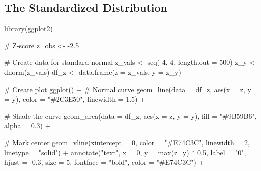 \documentclass[
  letterpaper,
  DIV=11,
  numbers=noendperiod]{scrreprt}
\newenvironment{Shaded}{\begin{snugshade}}{\end{snugshade}}
\newcommand{\AttributeTok}[1]{\textcolor[rgb]{0.40,0.45,0.13}{#1}}
\newcommand{\CommentTok}[1]{\textcolor[rgb]{0.37,0.37,0.37}{#1}}
\newcommand{\DecValTok}[1]{\textcolor[rgb]{0.68,0.00,0.00}{#1}}
\newcommand{\FloatTok}[1]{\textcolor[rgb]{0.68,0.00,0.00}{#1}}
\newcommand{\FunctionTok}[1]{\textcolor[rgb]{0.28,0.35,0.67}{#1}}
\newcommand{\NormalTok}[1]{\textcolor[rgb]{0.00,0.23,0.31}{#1}}
\newcommand{\OtherTok}[1]{\textcolor[rgb]{0.00,0.23,0.31}{#1}}
\newcommand{\SpecialCharTok}[1]{\textcolor[rgb]{0.37,0.37,0.37}{#1}}
\newcommand{\StringTok}[1]{\textcolor[rgb]{0.13,0.47,0.30}{#1}}
\begin{document}
\subsection{The Standardized
Distribution}\label{the-standardized-distribution}

\begin{Shaded}
\begin{Highlighting}[]
\FunctionTok{library}\NormalTok{(ggplot2)}

\CommentTok{\# Z{-}score}
\NormalTok{z\_obs }\OtherTok{\textless{}{-}} \SpecialCharTok{{-}}\FloatTok{2.5}

\CommentTok{\# Create data for standard normal}
\NormalTok{z\_vals }\OtherTok{\textless{}{-}} \FunctionTok{seq}\NormalTok{(}\SpecialCharTok{{-}}\DecValTok{4}\NormalTok{, }\DecValTok{4}\NormalTok{, }\AttributeTok{length.out =} \DecValTok{500}\NormalTok{)}
\NormalTok{z\_y }\OtherTok{\textless{}{-}} \FunctionTok{dnorm}\NormalTok{(z\_vals)}
\NormalTok{df\_z }\OtherTok{\textless{}{-}} \FunctionTok{data.frame}\NormalTok{(}\AttributeTok{z =}\NormalTok{ z\_vals, }\AttributeTok{y =}\NormalTok{ z\_y)}

\CommentTok{\# Create plot}
\FunctionTok{ggplot}\NormalTok{() }\SpecialCharTok{+}
  \CommentTok{\# Normal curve}
  \FunctionTok{geom\_line}\NormalTok{(}\AttributeTok{data =}\NormalTok{ df\_z, }\FunctionTok{aes}\NormalTok{(}\AttributeTok{x =}\NormalTok{ z, }\AttributeTok{y =}\NormalTok{ y), }
            \AttributeTok{color =} \StringTok{"\#2C3E50"}\NormalTok{, }\AttributeTok{linewidth =} \FloatTok{1.5}\NormalTok{) }\SpecialCharTok{+}
  
  \CommentTok{\# Shade the curve}
  \FunctionTok{geom\_area}\NormalTok{(}\AttributeTok{data =}\NormalTok{ df\_z, }\FunctionTok{aes}\NormalTok{(}\AttributeTok{x =}\NormalTok{ z, }\AttributeTok{y =}\NormalTok{ y),}
            \AttributeTok{fill =} \StringTok{"\#9B59B6"}\NormalTok{, }\AttributeTok{alpha =} \FloatTok{0.3}\NormalTok{) }\SpecialCharTok{+}
  
  \CommentTok{\# Mark center}
  \FunctionTok{geom\_vline}\NormalTok{(}\AttributeTok{xintercept =} \DecValTok{0}\NormalTok{, }\AttributeTok{color =} \StringTok{"\#E74C3C"}\NormalTok{, }
             \AttributeTok{linewidth =} \DecValTok{2}\NormalTok{, }\AttributeTok{linetype =} \StringTok{"solid"}\NormalTok{) }\SpecialCharTok{+}
  \FunctionTok{annotate}\NormalTok{(}\StringTok{"text"}\NormalTok{, }\AttributeTok{x =} \DecValTok{0}\NormalTok{, }\AttributeTok{y =} \FunctionTok{max}\NormalTok{(z\_y) }\SpecialCharTok{*} \FloatTok{0.5}\NormalTok{, }
           \AttributeTok{label =} \StringTok{"0"}\NormalTok{,}
           \AttributeTok{hjust =} \SpecialCharTok{{-}}\FloatTok{0.3}\NormalTok{, }\AttributeTok{size =} \DecValTok{5}\NormalTok{, }\AttributeTok{fontface =} \StringTok{"bold"}\NormalTok{, }\AttributeTok{color =} \StringTok{"\#E74C3C"}\NormalTok{) }\SpecialCharTok{+}
  

\end{Highlighting}
\end{Shaded}
\end{document}
